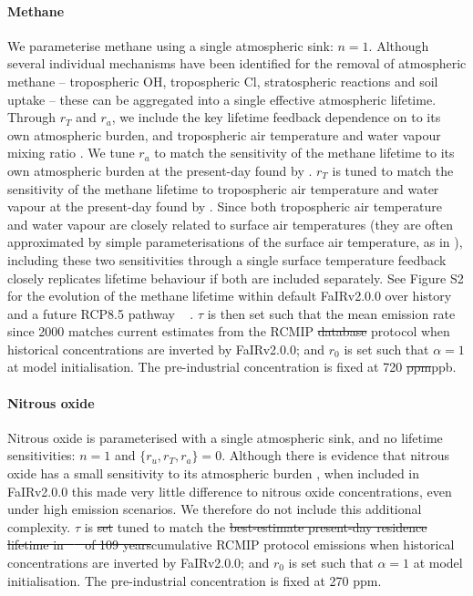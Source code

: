 \documentclass[gmd, manuscript]{copernicus}
\providecommand{\DIFadd}[1]{{\protect\color{blue}#1}} %
\providecommand{\DIFdel}[1]{{\protect\color{red}\sout{#1}}}                      %
\providecommand{\DIFaddbegin}{} %
\providecommand{\DIFaddend}{} %
\providecommand{\DIFdelbegin}{} %
\providecommand{\DIFdelend}{} %
\begin{document}
\paragraph*{Methane}
We parameterise methane using a single atmospheric sink: $n=1$. Although several individual mechanisms have been identified for the removal of atmospheric methane -- tropospheric OH, tropospheric Cl, stratospheric reactions and soil uptake \citep{Prather2012,Holmes2013} -- these can be aggregated into a single effective atmospheric lifetime. Through $r_T$ and $r_a$, we include the key lifetime feedback dependence on to its own atmospheric burden, and tropospheric air temperature and water vapour mixing ratio \citep{Holmes2013}. We tune $r_a$ to match the sensitivity of the methane lifetime to its own atmospheric burden at the present-day found by \cite{Holmes2013}. $r_T$ is tuned to match the sensitivity of the methane lifetime to tropospheric air temperature and water vapour at the present-day found by \cite{Holmes2013}. Since both tropospheric air temperature and water vapour are closely related to surface air temperatures (they are often approximated by simple parameterisations of the surface air temperature, as in \citet{Holmes2013}), including these two sensitivities through a single surface temperature feedback closely replicates lifetime behaviour if both are included separately. \DIFaddbegin \DIFadd{See Figure S2 for the evolution of the methane lifetime within default FaIRv2.0.0 over history and a future RCP8.5 pathway \mbox{%
\citep{Riahi2011}}\hspace{0pt}%
. }\DIFaddend $\tau$ is then set such that the mean emission rate since 2000 matches current estimates from the RCMIP \DIFdelbegin \DIFdel{database }\DIFdelend \DIFaddbegin \DIFadd{protocol }\DIFaddend \citep{Nicholls2019} when historical concentrations \citep{Meinshausen2017} are inverted by FaIRv2.0\DIFaddbegin \DIFadd{.0}\DIFaddend ; and $r_0$ is set such that $\alpha=1$ at model initialisation. The pre-industrial concentration is fixed at 720 \DIFdelbegin \DIFdel{ppm}\DIFdelend \DIFaddbegin \DIFadd{ppb}\DIFaddend .
\paragraph*{Nitrous oxide}
Nitrous oxide is parameterised with a single atmospheric sink, and no lifetime sensitivities: $n=1$ and $\{r_u,r_T,r_a\}=0$. Although there is evidence that nitrous oxide has a small sensitivity to its atmospheric burden \citep{Prather2015}, when included in FaIRv2.0\DIFaddbegin \DIFadd{.0 }\DIFaddend this made very little difference to nitrous oxide concentrations, even under high emission scenarios. We therefore do not include this additional complexity. $\tau$ is \DIFdelbegin \DIFdel{set }\DIFdelend \DIFaddbegin \DIFadd{tuned }\DIFaddend to match the \DIFdelbegin \DIFdel{best-estimate present-day residence lifetime in \mbox{%
\cite{Prather2015} }\hspace{0pt}%
of 109 years}\DIFdelend \DIFaddbegin \DIFadd{cumulative RCMIP protocol emissions when historical concentrations are inverted by FaIRv2.0.0}\DIFaddend ; and $r_0$ is set such that $\alpha=1$ at model initialisation. The pre-industrial concentration is fixed at 270 ppm.
\end{document}
